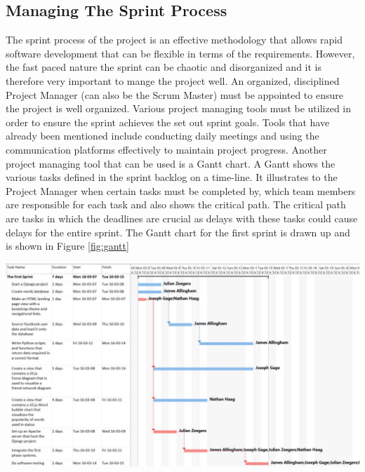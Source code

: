 \documentclass[12pt,onecolumn]{article}
\begin{document}
	\subsection{Managing The Sprint Process}
	The sprint process of the project is an effective methodology that allows rapid software development that can be flexible in terms of the requirements. However, the fast paced nature the sprint can be chaotic and disorganized and it is therefore very important to mange the project well. An organized, disciplined Project Manager (can also be the Scrum Master) must be appointed to ensure the project is well organized. Various project managing tools must be utilized in order to ensure the sprint achieves the set out sprint goals. Tools that have already been mentioned include conducting daily meetings and using the communication platforms effectively to maintain project progress. Another project managing tool that can be used is a Gantt chart. A Gantt shows the various tasks defined in the sprint backlog on a time-line. It illustrates to the Project Manager when certain tasks must be completed by, which team members are responsible for each task and also shows the critical path. The critical path are tasks in which the deadlines are crucial as delays with these tasks could cause delays for the entire sprint. The Gantt chart for the first sprint is drawn up and is shown in Figure \ref{fig:gantt}
	
	\begin{center}
		\includegraphics[width=\textwidth]{gantt}
		 \label{fig:gantt}
	\end{center}
	
\end{document}
